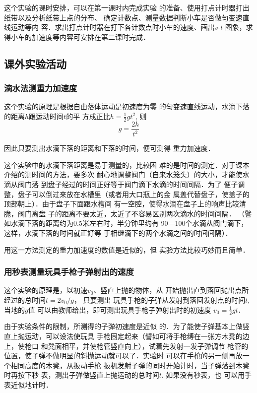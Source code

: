 这个实验的课时安排，可以在第一课时内完成实验
的准备、使用打点计时器打出纸带以及分析纸带上点的分布、
确定计数点、测量数据判断小车是否做匀变速直线运动等内
容．求出打点计时器在打下各计数点时小车的速度、画出$v$-$t$
图象，求得小车的加速度等内容可安排在第二课时完成．

\subsection{课外实验活动}
\subsubsection{滴水法测重力加速度}
这个实验的原理是根据自由落体运动是初速度为零
的匀变速直线运动，水滴下落的距离$h$跟运动时间$t$的平
方成正比$h=\frac{1}{2}gt^2$, 则 
\[g=\frac{2h}{t^2}\]

因此只要测出水滴下落的距离和下落的时间，便可测得
重力加速度．

这个实验中的水滴下落距离是易于测量的，比较困
难的是时间的测定．对于课本介绍的测时间的方法，要多次
耐心地调整阀门（自来水笼头）的大小，才能使水滴从阀门落
到盘子经过的时间正好等于阀门滴下水滴的时间间隔．为了
便子调整，盘子可以倒过来放在水槽里（或者用大口瓶上的金
属盖代替盘子，使盖子的顶部朝上）．由于盘子下面跟水槽间
有一空腔，使得水滴在盘子上的响声比较清脆，阀门离盘
子的距离不要太近，太近了不容易区别两次滴水的时间间隔．
（譬如水滴下落的距离约为0.5米左右时，半分钟里约有
90—100个水滴从阀门滴下，这样，水滴下落的时间就正好等
于相继滴下的两个水滴之间的时间间隔）．

用这一方法测定的重力加速度的数值是近似的，但
实验方法比较巧妙而且简单．

\subsubsection{用秒表测量玩具手枪子弹射出的速度}
这个实验的原理是，以初速$v_0$、竖直上抛的物体，从
开始抛出直到落回抛出点所经过的总时间$t=2v_0/g$，
只要测出
玩具手枪的子弹从发射到落回发射点的时间$t$, 当地的$g$值
可以由教师给出，即可测出玩具手枪子弹射出时的初速度
$v_0=\frac{1}{2}gt$．

由于实验条件的限制，所测得的子弹初速度是近似
的．为了能使子弹基本上做竖直上抛运动，可以设法使玩具
手枪固定起来（譬如可将手枪缚在一张方木凳的边上，使枪口
和凳面相平，并使枪管竖直向上），试着先发射一发子弹调节
枪管的位置，使子弹不做明显的斜抛运动就可以了．实验时
可以在手枪的另一侧再放一个相同高度的木凳，从扳动手枪
扳机发射子弹的同时开始计时，当子弹落到木凳时再按下秒
表，测出子弹做竖直上抛运动的总时间$t$. 如果没有秒表，也
可以用手表近似地计时．

